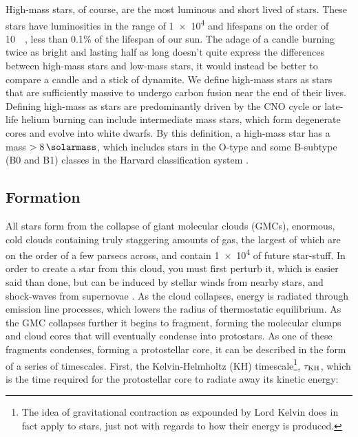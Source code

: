 High-mass stars, of course, are the most luminous and short lived of stars.
These stars have luminosities in the range of \SI{1e4}{\solarluminosity} and lifespans on the order of \SI{10}{\mega\year}, less than 0.1\% of the lifespan of our sun.
The adage of a candle burning twice as bright and lasting half as long doesn't quite express the differences between high-mass stars and low-mass stars, it would instead be better to compare a candle and a stick of dynamite.
We define high-mass stars as stars that are sufficiently massive to undergo carbon fusion near the end of their lives.
Defining high-mass as stars are predominantly driven by the CNO cycle or late-life helium burning can include intermediate mass stars, which form degenerate cores and evolve into white dwarfs.
By this definition, a high-mass star has a mass $>\SI{8}{\solarmass}$, which includes stars in the O-type and some B-subtype (B0 and B1) classes in the Harvard classification system
\parencite[143]{ward-thompsonIntroductionStarFormation2011}.


\subsection{Formation}
\label{sec:starformation}

All stars form from the collapse of giant molecular clouds (GMCs), enormous, cold clouds containing truly staggering amounts of gas, the largest of which are on the order of a few parsecs across, and contain \SI{1e4}{\solarmass} of future star-stuff.
In order to create a star from this cloud, you must first perturb it, which is easier said than done, but can be induced by stellar winds from nearby stars, and shock-waves from supernovae
\parencite[Ch.~3]{bodenheimerPrinciplesStarFormation2011}.
As the cloud collapses, energy is radiated through emission line processes, which lowers the radius of thermostatic equilibrium.
As the GMC collapses further it begins to fragment, forming the molecular clumps and cloud cores that will eventually condense into protostars.
As one of these fragments condenses, forming a protostellar core, it can be described in the form of a series of timescales.
First, the Kelvin-Helmholtz (KH) timescale\footnote{The idea of gravitational contraction as expounded by Lord Kelvin does in fact apply to stars, just not with regards to how their energy is produced.}, $\tau_\text{KH}$, which is the time required for the protostellar core to radiate away its kinetic energy:

